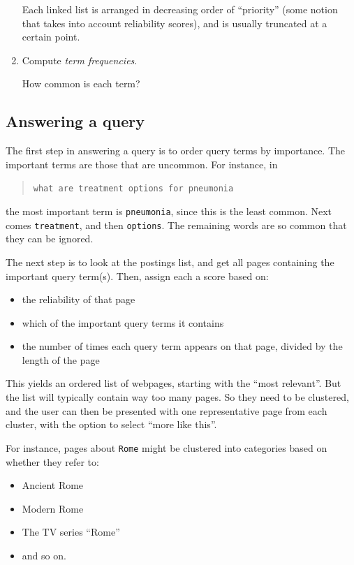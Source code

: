 \documentclass{report}
\theoremstyle{plain}
\theoremstyle{definition}
\begin{document}
\begin{enumerate}
Each linked list is arranged in decreasing order of ``priority'' (some notion that takes into account reliability scores), and is usually truncated at a certain point.

\item Compute {\it term frequencies}.

How common is each term?

\end{enumerate}

\subsection{Answering a query}

The first step in answering a query is to order query terms by importance. The important terms are those that are uncommon. For instance, in
\begin{quote}
{\tt what are treatment options for pneumonia}
\end{quote}
the most important term is {\tt pneumonia}, since this is the least common. Next comes {\tt treatment}, and then {\tt options}. The remaining words are so common that they can be ignored.

The next step is to look at the postings list, and get all pages containing the important query term(s). Then, assign each a score based on:
\begin{itemize}
\item the reliability of that page
\item which of the important query terms it contains
\item the number of times each query term appears on that page, divided by the length of the page
\end{itemize}

This yields an ordered list of webpages, starting with the ``most relevant''. But the list will typically contain way too many pages. So they need to be clustered, and the user can then be presented with one representative page from each cluster, with the option to select ``more like this''.

For instance, pages about {\tt Rome} might be clustered into categories based on whether they refer to:
\begin{itemize}
\item Ancient Rome
\item Modern Rome
\item The TV series ``Rome''
\item and so on.
\end{itemize}
\end{document}
